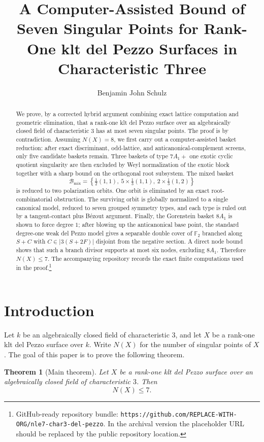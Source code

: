 \documentclass[11pt]{article}
\title{A Computer-Assisted Bound of Seven Singular Points for Rank-One klt del Pezzo Surfaces in Characteristic Three}
\author{Benjamin John Schulz}
\date{}
\newcommand{\repourl}{\texttt{https://github.com/REPLACE-WITH-ORG/nle7-char3-del-pezzo}}
\newtheorem{theorem}{Theorem}[section]
\theoremstyle{definition}
\begin{document}
\maketitle

\begin{abstract}
We prove, by a corrected hybrid argument combining exact lattice computation and geometric elimination, that a rank-one klt del Pezzo surface over an algebraically closed field of characteristic $3$ has at most seven singular points. The proof is by contradiction. Assuming $N(X)=8$, we first carry out a computer-assisted basket reduction: after exact discriminant, odd-lattice, and anticanonical-complement screens, only five candidate baskets remain. Three baskets of type $7A_1+$ one exotic cyclic quotient singularity are then excluded by Weyl normalization of the exotic block together with a sharp bound on the orthogonal root subsystem. The mixed basket
\[
\mathcal B_{\mathrm{mix}}=\left\{\tfrac12(1,1),\ 5\times\tfrac13(1,1),\ 2\times\tfrac13(1,2)\right\}
\]
is reduced to two polarization orbits. One orbit is eliminated by an exact root-combinatorial obstruction. The surviving orbit is globally normalized to a single canonical model, reduced to seven grouped symmetry types, and each type is ruled out by a tangent-contact plus B\'ezout argument. Finally, the Gorenstein basket $8A_1$ is shown to force degree $1$; after blowing up the anticanonical base point, the standard degree-one weak del Pezzo model gives a separable double cover of $\mathbb F_2$ branched along $S+C$ with $C\in |3(S+2F)|$ disjoint from the negative section. A direct node bound shows that such a branch divisor supports at most six nodes, excluding $8A_1$. Therefore $N(X)\le 7$. The accompanying repository records the exact finite computations used in the proof.\footnote{GitHub-ready repository bundle: \repourl. In the archival version the placeholder URL should be replaced by the public repository location.}
\end{abstract}

\tableofcontents

\section{Introduction}
Let $k$ be an algebraically closed field of characteristic $3$, and let $X$ be a rank-one klt del Pezzo surface over $k$. Write $N(X)$ for the number of singular points of $X$. The goal of this paper is to prove the following theorem.

\begin{theorem}[Main theorem]\label{thm:main}
Let $X$ be a rank-one klt del Pezzo surface over an algebraically closed field of characteristic $3$. Then
\[
N(X)\le 7.
\]
\end{theorem}
\end{document}
